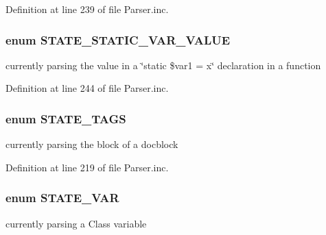 \-Definition at line 239 of file \-Parser.\-inc.

\hypertarget{_parser_8inc_afe312837f15f352b0de1e0498bf58e19}{
\subsubsection[{\-S\-T\-A\-T\-E\-\_\-\-S\-T\-A\-T\-I\-C\-\_\-\-V\-A\-R\-\_\-\-V\-A\-L\-U\-E}]{\setlength{\rightskip}{0pt plus 5cm}enum {\bf \-S\-T\-A\-T\-E\-\_\-\-S\-T\-A\-T\-I\-C\-\_\-\-V\-A\-R\-\_\-\-V\-A\-L\-U\-E}}}\label{_parser_8inc_afe312837f15f352b0de1e0498bf58e19}
currently parsing the value in a \char`\"{}static \$var1 = x\char`\"{} declaration in a function 

\-Definition at line 244 of file \-Parser.\-inc.

\hypertarget{_parser_8inc_a10a5fbccb3c5183738fe19d1ef59c2cc}{
\subsubsection[{\-S\-T\-A\-T\-E\-\_\-\-T\-A\-G\-S}]{\setlength{\rightskip}{0pt plus 5cm}enum {\bf \-S\-T\-A\-T\-E\-\_\-\-T\-A\-G\-S}}}\label{_parser_8inc_a10a5fbccb3c5183738fe19d1ef59c2cc}
currently parsing the  block of a docblock 

\-Definition at line 219 of file \-Parser.\-inc.

\hypertarget{_parser_8inc_a5fdc9432512b0a0d264f248273fde458}{
\subsubsection[{\-S\-T\-A\-T\-E\-\_\-\-V\-A\-R}]{\setlength{\rightskip}{0pt plus 5cm}enum {\bf \-S\-T\-A\-T\-E\-\_\-\-V\-A\-R}}}\label{_parser_8inc_a5fdc9432512b0a0d264f248273fde458}
currently parsing a \-Class variable 

